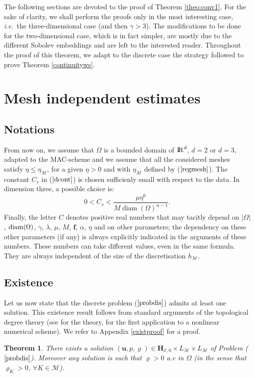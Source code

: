 \documentclass{amsart}
\newtheorem{thm}{Theorem}
\numberwithin{equation}{section}
\begin{document}
The following sections are devoted to the proof of Theorem \ref{theo:conv1}. For the sake of clarity, we shall perform the proofs only in the most interesting case, {\emph{i.e.\/}}\ the three-dimensional case (and then $\gamma>3$).
The modifications to be done for the two-dimensional case, which is in fact simpler, are mostly due to the different Sobolev embeddings and are left to the interested reader. Throughout the proof of this theorem, we adapt to the discrete case the strategy followed to prove Theorem \ref{continuityws}.
\section{Mesh independent estimates}\label{4}

\subsection{Notations}

From now on, we assume that $\Omega$ is a bounded domain of ${\ifmmode{\rm	I\mkern-3.1mu
R\mkern1mu}\else{\rm I\kern-.18em 
R\hskip1pt\	}\fi\relax}^d$, $d=2$ or $d=3$, adapted to the MAC-scheme and we assume that all the considered meshes satisfy $\eta \le \eta_{{\mathcal M}} $, for a given $\eta>0$ and with $\eta_{{\mathcal M}} $ defined by ($\ref{regmesh}$). The constant ${C_s}$ in ($\ref{dcont}$) is chosen sufficienly small with respect to the data. In dimension three, a possible choice is:
\begin{equation}\label{cstestab}
0< {C_s} < \frac{\mu \eta^6}{  M \operatorname{diam}(\Omega)^{\alpha-1}}.
\end{equation}
Finally, the letter $C$ denotes positive real numbers that may tacitly depend on $|\Omega|$, ${\rm diam}(\Omega)$, $\gamma$, $\lambda$, $\mu$, $M$, $\bm{f}$, $\alpha$, $\eta$ and on other parameters; the dependency on these other parameters (if any) is always explicitly indicated in the arguments of these numbers.
These numbers can take different values, even in the same formula.
They are always independent of the size of the discretisation $h_{{\mathcal M}}$.
\subsection{Existence}

Let us now state that the discrete problem ($\ref{probdis}$) admits at least one solution.
This existence result follows from standard arguments of the topological degree theory (see \cite{dei-85-non} for the theory, \cite{eymard1998error} for the first application to a nonlinear numerical scheme).
We refer to Appendix \ref{existproof} for a proof.
\begin{thm}\label{thmexist}
There exists a solution $({{\boldsymbol u}},p,{\varrho}) \in {{\mathbf{H}_{{{\mathcal E}},0}}} \times L_{{\mathcal M}} \times L_{{\mathcal M}}$ of Problem ($\ref{probdis}$). Moreover any solution is such that $ {\varrho} > 0 $ a.e in $\Omega$ (in the sense that $ {\varrho}_K>0,\ \forall K \in {{\mathcal M}}$).
\end{thm}
\end{document}
